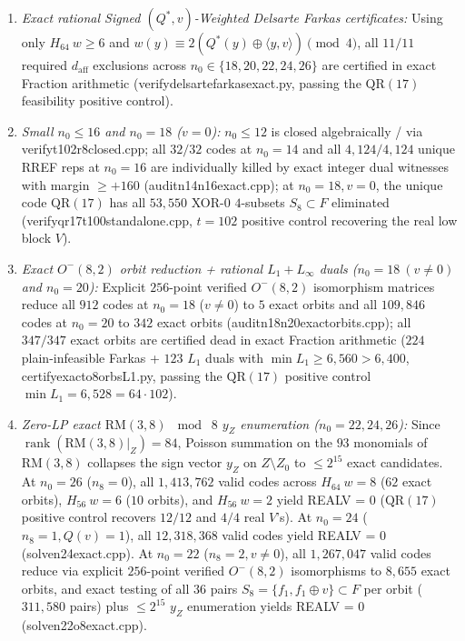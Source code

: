 \documentclass[11pt]{article}
\theoremstyle{definition}
\newcommand{\rank}{\operatorname{rank}}
\newcommand{\code}[1]{{\ttfamily\small\renewcommand{\_}{\textunderscore\allowbreak}#1}}
\begin{document}
\begin{itemize}[nosep]
\begin{enumerate}[nosep]
      \item \emph{Exact rational Signed $(Q^*, v)$-Weighted Delsarte Farkas certificates:} Using only $H_{64}\ w \ge 6$ and $w(y) \equiv 2(Q^*(y) \oplus \langle y, v\rangle) \pmod 4$, all $11/11$ required $d_{\mathrm{aff}}$ exclusions across $n_0 \in \{18, 20, 22, 24, 26\}$ are certified in exact \code{Fraction} arithmetic (\code{verify\_delsarte\_farkas\_exact.py}, passing the $\mathrm{QR}(17)$ feasibility positive control).
      \item \emph{Small $n_0 \le 16$ and $n_0 = 18$ ($v = 0$):} $n_0 \le 12$ is closed algebraically / via \code{verify\_t102\_r8\_closed.cpp}; all $32/32$ codes at $n_0 = 14$ and all $4{,}124/4{,}124$ unique RREF reps at $n_0 = 16$ are individually killed by exact integer dual witnesses with margin $\ge +160$ (\code{audit\_n14\_n16\_exact.cpp}); at $n_0 = 18, v=0$, the unique code $\mathrm{QR}(17)$ has all $53{,}550$ XOR-$0$ $4$-subsets $S_8 \subset F$ eliminated (\code{verify\_qr17\_t100\_standalone.cpp}, $t=102$ positive control recovering the real low block $V$).
      \item \emph{Exact $O^-(8,2)$ orbit reduction + rational $L_1 + L_\infty$ duals ($n_0 = 18\ (v\neq 0)$ and $n_0 = 20$):} Explicit $256$-point verified $O^-(8,2)$ isomorphism matrices reduce all $912$ codes at $n_0 = 18$ ($v \neq 0$) to $5$ exact orbits and all $109{,}846$ codes at $n_0 = 20$ to $342$ exact orbits (\code{audit\_n18\_n20\_exact\_orbits.cpp}); all $347/347$ exact orbits are certified dead in exact \code{Fraction} arithmetic ($224$ plain-infeasible Farkas + $123$ $L_1$ duals with $\min L_1 \ge 6{,}560 > 6{,}400$, \code{certify\_exact\_o8\_orbs\_L1.py}, passing the $\mathrm{QR}(17)$ positive control $\min L_1 = 6{,}528 = 64 \cdot 102$).
      \item \emph{Zero-LP exact $\mathrm{RM}(3,8)$ $\bmod\;8$ $y_Z$ enumeration ($n_0 = 22, 24, 26$):} Since $\rank(\mathrm{RM}(3,8)|_Z) = 84$, Poisson summation on the $93$ monomials of $\mathrm{RM}(3,8)$ collapses the sign vector $y_Z$ on $Z \setminus Z_0$ to $\le 2^{15}$ exact candidates. At $n_0 = 26$ ($n_8 = 0$), all $1{,}413{,}762$ valid codes across $H_{64}\ w=8$ ($62$ exact orbits), $H_{56}\ w=6$ ($10$ orbits), and $H_{56}\ w=2$ yield \code{REAL\_V = 0} ($\mathrm{QR}(17)$ positive control recovers $12/12$ and $4/4$ real $V$'s). At $n_0 = 24$ ($n_8 = 1, Q(v)=1$), all $12{,}318{,}368$ valid codes yield \code{REAL\_V = 0} (\code{solve\_n24\_exact.cpp}). At $n_0 = 22$ ($n_8 = 2, v \neq 0$), all $1{,}267{,}047$ valid codes reduce via explicit $256$-point verified $O^-(8,2)$ isomorphisms to $8{,}655$ exact orbits, and exact testing of all $36$ pairs $S_8 = \{f_1, f_1 \oplus v\} \subset F$ per orbit ($311{,}580$ pairs) plus $\le 2^{15}$ $y_Z$ enumeration yields \code{REAL\_V = 0} (\code{solve\_n22\_o8\_exact.cpp}).
    \end{enumerate}
\end{itemize}
\end{document}
